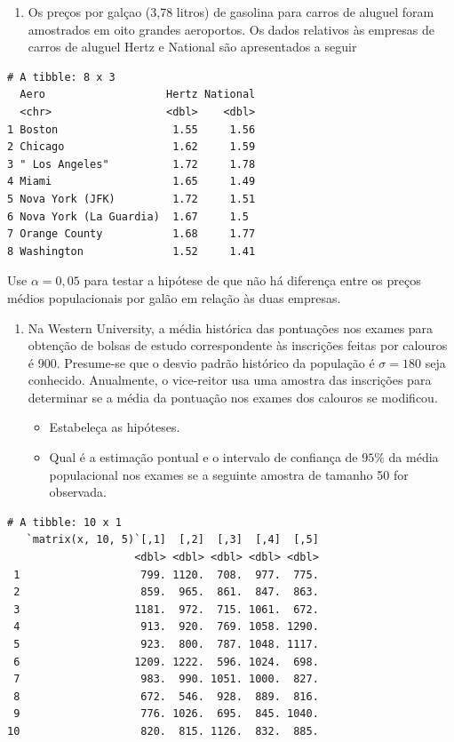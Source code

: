 \documentclass[10pt,a4paper]{book}
\providecommand{\tightlist}{%
  \setlength{\itemsep}{0pt}\setlength{\parskip}{0pt}}
\begin{document}
\begin{enumerate}
\def\labelenumi{\arabic{enumi}.}
\setcounter{enumi}{1}
\tightlist
\item
  Os preços por galçao (3,78 litros) de gasolina para carros de aluguel
  foram amostrados em oito grandes aeroportos. Os dados relativos às
  empresas de carros de aluguel Hertz e National são apresentados a
  seguir
\end{enumerate}

\begin{verbatim}
# A tibble: 8 x 3
  Aero                   Hertz National
  <chr>                  <dbl>    <dbl>
1 Boston                  1.55     1.56
2 Chicago                 1.62     1.59
3 " Los Angeles"          1.72     1.78
4 Miami                   1.65     1.49
5 Nova York (JFK)         1.72     1.51
6 Nova York (La Guardia)  1.67     1.5 
7 Orange County           1.68     1.77
8 Washington              1.52     1.41
\end{verbatim}

Use \(\alpha = 0,05\) para testar a hipótese de que não há diferença
entre os preços médios populacionais por galão em relação às duas
empresas.

\begin{enumerate}
\def\labelenumi{\arabic{enumi}.}
\setcounter{enumi}{2}
\tightlist
\item
  Na Western University, a média histórica das pontuações nos exames
  para obtenção de bolsas de estudo correspondente às inscrições feitas
  por calouros é 900. Presume-se que o desvio padrão histórico da
  população é \(\sigma = 180\) seja conhecido. Anualmente, o vice-reitor
  usa uma amostra das inscrições para determinar se a média da pontuação
  nos exames dos calouros se modificou.

  \begin{itemize}
  \tightlist
  \item
    Estabeleça as hipóteses.
  \item
    Qual é a estimação pontual e o intervalo de confiança de \(95\%\) da
    média populacional nos exames se a seguinte amostra de tamanho 50
    for observada.
  \end{itemize}
\end{enumerate}

\begin{verbatim}
# A tibble: 10 x 1
   `matrix(x, 10, 5)`[,1]  [,2]  [,3]  [,4]  [,5]
                    <dbl> <dbl> <dbl> <dbl> <dbl>
 1                   799. 1120.  708.  977.  775.
 2                   859.  965.  861.  847.  863.
 3                  1181.  972.  715. 1061.  672.
 4                   913.  920.  769. 1058. 1290.
 5                   923.  800.  787. 1048. 1117.
 6                  1209. 1222.  596. 1024.  698.
 7                   983.  990. 1051. 1000.  827.
 8                   672.  546.  928.  889.  816.
 9                   776. 1026.  695.  845. 1040.
10                   820.  815. 1126.  832.  885.
\end{verbatim}
\end{document}
